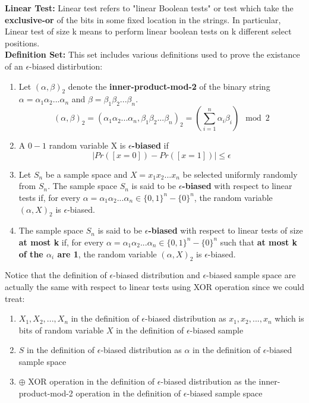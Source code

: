 \documentclass[a4paper, english]{paper}
\begin{document}
	\noindent\textbf{Linear Test:} Linear test refers to "linear Boolean tests" or test which take the \textbf{exclusive-or} of the bits in some fixed location in the strings. In particular, Linear test of size k means to perform linear boolean tests on k different select positions.\\

	\noindent\textbf{Definition Set:} This set includes various definitions used to prove the existance of an $\epsilon$-biased distirbution:
	\begin{enumerate}
	\item Let $(\alpha,\beta)_2$ denote the \textbf{inner-product-mod-2} of the binary string $\alpha=\alpha_1\alpha_2...\alpha_n$ and $\beta=\beta_1\beta_2...\beta_n$.
	$$(\alpha,\beta)_2 =(\alpha_1\alpha_2...\alpha_n,\beta_1\beta_2...\beta_n)_2= (\sum_{i=1}^n \alpha_i\beta_i) \mod 2$$
	\item A $0-1$ random variable X is \textbf{$\epsilon$-biased} if
		$$|Pr([x=0])-Pr([x=1])|\le \epsilon$$
	\item Let $S_n$ be a sample space and $X=x_1x_2...x_n$ be selected uniformly randomly from $S_n$. The sample space $S_n$ is said to be \textbf{$\epsilon$-biased} with respect to linear tests if, for every $\alpha=\alpha_1\alpha_2...\alpha_n\in\{0,1\}^n-\{0\}^n$, the random variable $(\alpha,X)_2$ is $\epsilon$-biased.
	\item The sample space $S_n$ is said to be \textbf{$\epsilon$-biased} with respect to linear tests of size \textbf{at most k} if, for every $\alpha=\alpha_1\alpha_2...\alpha_n\in\{0,1\}^n-\{0\}^n$ such that \textbf{at most k of the $\alpha_i$ are 1}, the random variable $(\alpha,X)_2$ is $\epsilon$-biased.
	\end{enumerate}
	Notice that the definition of $\epsilon$-biased distribution and $\epsilon$-biased sample space are actually the same with respect to linear tests using XOR operation since we could treat:
	\begin{enumerate}
		\item $X_1,X_2,...,X_n$ in the definition of $\epsilon$-biased distribution as $x_1,x_2,...,x_n$ which is bits of random variable $X$ in the definition of $\epsilon$-biased sample
		\item $S$  in the definition of $\epsilon$-biased distribution as $\alpha$ in the definition of $\epsilon$-biased sample space
		\item $\oplus$ XOR operation in the definition of $\epsilon$-biased distribution as the inner-product-mod-2 operation in the definition of $\epsilon$-biased sample space
	\end{enumerate}
	
\end{document}
